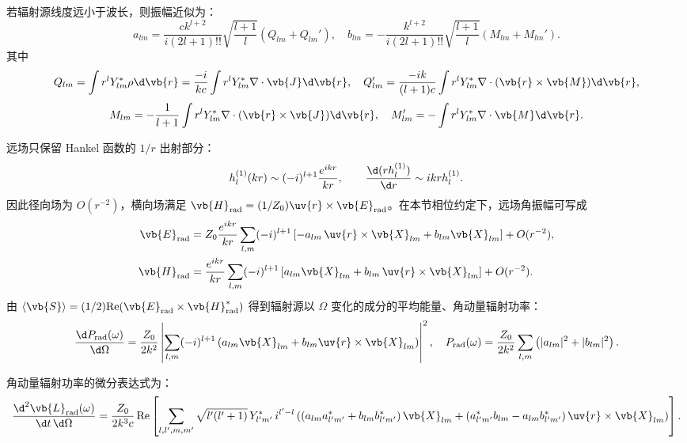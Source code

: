 若辐射源线度远小于波长，则振幅近似为：
\begin{equation*}
	a_{lm} = \frac{c k^{l+2}}{i (2l+1)!!} \sqrt{\frac{l+1}{l}} (Q_{lm} + Q_{lm}'),\quad
	b_{lm} = -\frac{k^{l+2}}{i (2l+1)!!} \sqrt{\frac{l+1}{l}} (M_{lm} + M_{lm}').
\end{equation*}
其中
\begin{equation*}
	Q_{lm} = \int r^l Y_{lm}^\ast \rho \d \vb{r} = \frac{-i}{k c} \int r^l Y_{lm}^\ast \nabla \cdot \vb{J} \d \vb{r},\quad
	Q_{lm}' = \frac{-i k}{(l+1) c} \int r^l Y_{lm}^\ast \nabla \cdot (\vb{r} \times \vb{M}) \d \vb{r},
\end{equation*}
\begin{equation*}
	M_{lm} = -\frac{1}{l+1} \int r^l Y_{lm}^\ast \nabla \cdot (\vb{r} \times \vb{J}) \d \vb{r},\quad
	M_{lm}' = -\int r^l Y_{lm}^\ast \nabla \cdot \vb{M} \d \vb{r}.
\end{equation*}

远场只保留 Hankel 函数的 \(1/r\) 出射部分：
\begin{equation*}
	h_l^{(1)}(kr)\sim (-i)^{l+1}\frac{e^{ikr}}{kr},\qquad
	\frac{\d (r h_l^{(1)})}{\d r}\sim i k r h_l^{(1)} .
\end{equation*}
因此径向场为 \(O(r^{-2})\)，横向场满足 \(\vb{H}_{\mathrm{rad}}=(1/Z_0)\uv{r}\times\vb{E}_{\mathrm{rad}}\)。在本节相位约定下，远场角振幅可写成
\begin{align*}
	\vb{E}_{\mathrm{rad}}
	&=Z_0\frac{e^{ikr}}{kr}
	\sum_{l,m}(-i)^{l+1}\left[-a_{lm}\,\uv{r}\times\vb{X}_{lm}+b_{lm}\vb{X}_{lm}\right]+O(r^{-2}),\\
	\vb{H}_{\mathrm{rad}}
	&=\frac{e^{ikr}}{kr}
	\sum_{l,m}(-i)^{l+1}\left[a_{lm}\vb{X}_{lm}+b_{lm}\,\uv{r}\times\vb{X}_{lm}\right]+O(r^{-2}).
\end{align*}
由 \(\langle\vb{S}\rangle=(1/2)\mathrm{Re}(\vb{E}_{\mathrm{rad}}\times\vb{H}_{\mathrm{rad}}^\ast)\) 得到辐射源以 \(\Omega\) 变化的成分的平均能量、角动量辐射功率：
\begin{equation*}
	\frac{\d P_{\text{rad}}(\omega)}{\d \Omega} = \frac{Z_0}{2k^2} \left| \sum_{l,m}(-i)^{l+1} \left( a_{lm} \vb{X}_{lm} + b_{lm} \uv{r} \times \vb{X}_{lm} \right) \right|^2,\quad
	P_{\text{rad}}(\omega) = \frac{Z_0}{2k^2} \sum_{l,m} \left( |a_{lm}|^2 + |b_{lm}|^2 \right).
\end{equation*}

角动量辐射功率的微分表达式为：
\begin{equation*}
	\frac{\d^2 \vb{L}_{\text{rad}}(\omega)}{\d t \, \d \Omega} = \frac{Z_0}{2k^3 c} \, \text{Re} \left[ \sum_{l,l',m,m'} \sqrt{l'(l' + 1)} \, Y_{l'm'}^\ast \, i^{l' - l}\left( \left( a_{lm} a_{l'm'}^\ast + b_{lm} b_{l'm'}^\ast \right) \vb{X}_{lm} + \left( a_{l'm'}^\ast b_{lm} - a_{lm} b_{l'm'}^\ast \right) \uv{r} \times \vb{X}_{lm}	\right) \right].
\end{equation*}

